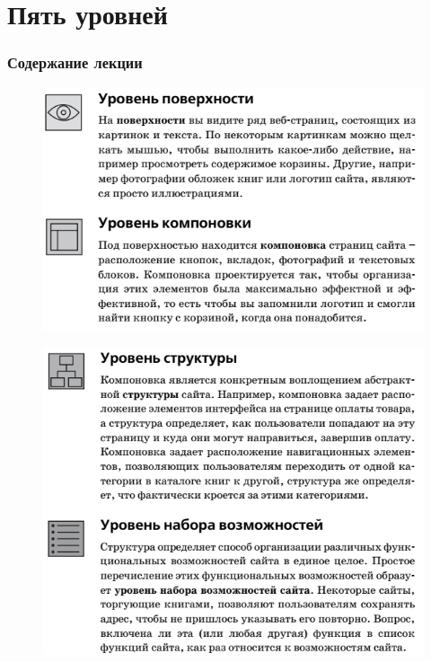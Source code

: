 \documentclass{beamer}
\begin{document}
\section{Пять уровней}

\begin{frame}
  \frametitle{Содержание лекции}
  \tableofcontents[current]
\end{frame}

\begin{frame}
\begin{figure}[h]
\centering
\includegraphics[scale=0.7]{images/lec01-pic04.png}
\end{figure}
\end{frame}

\begin{frame}
\begin{figure}[h]
\centering
\includegraphics[scale=0.7]{images/lec01-pic05.png}
\end{figure}
\end{frame}
\end{document}

